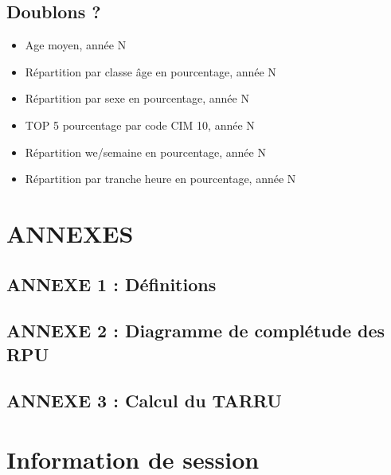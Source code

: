 \documentclass[]{article}
\begin{document}
\subsection{Doublons ?}\label{doublons}

\begin{itemize}
\itemsep1pt\parskip0pt
\item
  Age moyen, année N
\item
  Répartition par classe âge en pourcentage, année N
\item
  Répartition par sexe en pourcentage, année N
\item
  TOP 5 pourcentage par code CIM 10, année N
\item
  Répartition we/semaine en pourcentage, année N
\item
  Répartition par tranche heure en pourcentage, année N
\end{itemize}

\section{ANNEXES}\label{annexes}

\subsection{ANNEXE 1 : Définitions}\label{annexe-1-definitions}

\subsection{ANNEXE 2 : Diagramme de complétude des
RPU}\label{annexe-2-diagramme-de-completude-des-rpu}

\subsection{ANNEXE 3 : Calcul du TARRU}\label{annexe-3-calcul-du-tarru}

\section{Information de session}\label{information-de-session}
\end{document}

